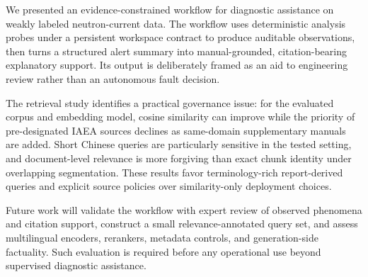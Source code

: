 We presented an evidence-constrained workflow for diagnostic assistance on weakly labeled neutron-current data. The workflow uses deterministic analysis probes under a persistent workspace contract to produce auditable observations, then turns a structured alert summary into manual-grounded, citation-bearing explanatory support. Its output is deliberately framed as an aid to engineering review rather than an autonomous fault decision.

The retrieval study identifies a practical governance issue: for the evaluated corpus and embedding model, cosine similarity can improve while the priority of pre-designated IAEA sources declines as same-domain supplementary manuals are added. Short Chinese queries are particularly sensitive in the tested setting, and document-level relevance is more forgiving than exact chunk identity under overlapping segmentation. These results favor terminology-rich report-derived queries and explicit source policies over similarity-only deployment choices.

Future work will validate the workflow with expert review of observed phenomena and citation support, construct a small relevance-annotated query set, and assess multilingual encoders, rerankers, metadata controls, and generation-side factuality. Such evaluation is required before any operational use beyond supervised diagnostic assistance.

